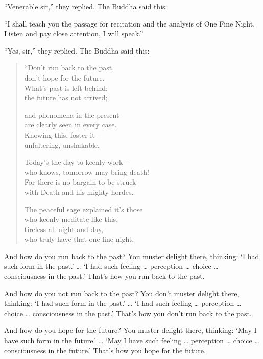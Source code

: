 \documentclass[12pt,openany]{book}%
\begin{document}
“Venerable sir,” they replied. The Buddha said this: 

“I shall teach you the passage for recitation and the analysis of One Fine Night. Listen and pay close attention, I will speak.” 

“Yes, sir,” they replied. The Buddha said this: 

\begin{verse}%
“Don’t run back to the past, \\
don’t hope for the future. \\
What’s past is left behind; \\
the future has not arrived; 

and phenomena in the present \\
are clearly seen in every case. \\
Knowing this, foster it—\\
unfaltering, unshakable. 

Today’s the day to keenly work—\\
who knows, tomorrow may bring death! \\
For there is no bargain to be struck \\
with Death and his mighty hordes. 

The peaceful sage explained it’s those \\
who keenly meditate like this, \\
tireless all night and day, \\
who truly have that one fine night. 

%
\end{verse}

And how do you run back to the past? You muster delight there, thinking: ‘I had such form in the past.’ … ‘I had such feeling … perception … choice … consciousness in the past.’ That’s how you run back to the past. 

And how do you not run back to the past? You don’t muster delight there, thinking: ‘I had such form in the past.’ … ‘I had such feeling … perception … choice … consciousness in the past.’ That’s how you don’t run back to the past. 

And how do you hope for the future? You muster delight there, thinking: ‘May I have such form in the future.’ … ‘May I have such feeling … perception … choice … consciousness in the future.’ That’s how you hope for the future. 
\end{document}
